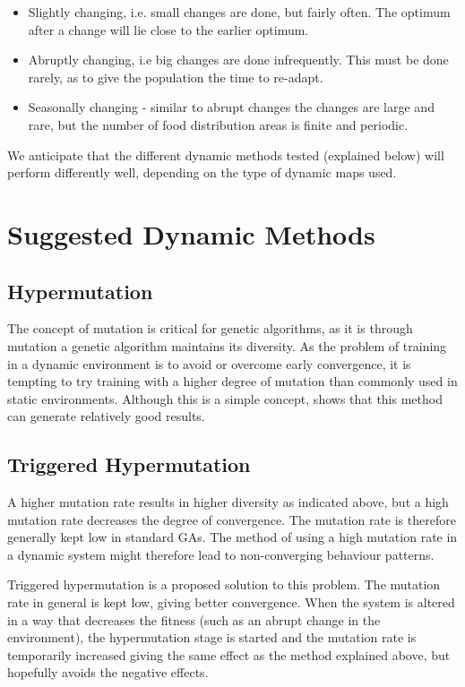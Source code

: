 \documentclass[a4paper,12pt]{article}
\begin{document}
\begin{itemize}

\item
Slightly changing, i.e.  small changes are done, but fairly often. The optimum after a change will lie close to the earlier optimum.
\item
Abruptly changing, i.e  big changes are done infrequently. This must be done rarely, as to give the population the time to re-adapt.
\item
Seasonally changing - similar to abrupt changes the changes are large and rare, but the number of food distribution areas is finite and periodic.
\end{itemize}

We anticipate that the different dynamic methods tested (explained below) will perform differently well, depending on the type of dynamic maps used.

\section{Suggested Dynamic Methods}
\subsection{Hypermutation}
The concept of mutation is critical for genetic algorithms, as it is through mutation a genetic algorithm maintains its diversity. As the problem of training in a dynamic environment is to avoid or overcome early convergence, it is tempting to try training with a higher degree of mutation than commonly used in static environments. Although this is a simple concept, \cite{cobb} shows that this method can generate relatively good results.

\subsection{Triggered Hypermutation}
A higher mutation rate results in higher diversity as indicated above, but a high mutation rate decreases the degree of convergence. The mutation rate is therefore generally kept low in standard GAs. The method of using a high mutation rate in a dynamic system might therefore lead to non-converging behaviour patterns.

Triggered hypermutation is a proposed solution to this problem. The mutation rate in general is kept low, giving better convergence. When the system is altered in a way that decreases the fitness (such as an abrupt change in the environment), the hypermutation stage is started and the mutation rate is temporarily increased giving the same effect as the method explained above, but hopefully avoids the negative effects.
\end{document}
